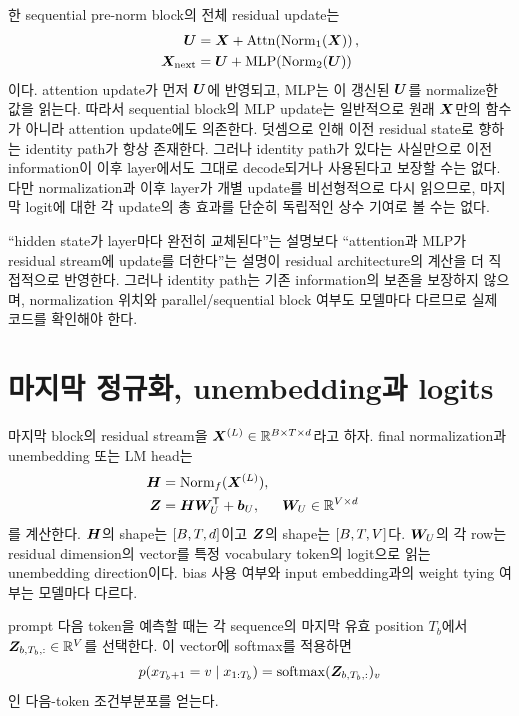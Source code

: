 한 sequential pre-norm block의 전체 residual update는
\begin{align}
  \bm{U}
  &=\bm{X}
    +\operatorname{Attn}\!\left(\operatorname{Norm}_{1}(\bm{X})\right),\\
  \bm{X}_{\mathrm{next}}
  &=\bm{U}
    +\operatorname{MLP}\!\left(\operatorname{Norm}_{2}(\bm{U})\right)
\end{align}
이다.
attention update가 먼저 $\bm{U}$에 반영되고, MLP는 이 갱신된 $\bm{U}$를 normalize한 값을 읽는다.
따라서 sequential block의 MLP update는 일반적으로 원래 $\bm{X}$만의 함수가 아니라 attention update에도 의존한다.
덧셈으로 인해 이전 residual state로 향하는 identity path가 항상 존재한다.
그러나 identity path가 있다는 사실만으로 이전 information이 이후 layer에서도 그대로 decode되거나 사용된다고 보장할 수는 없다.
다만 normalization과 이후 layer가 개별 update를 비선형적으로 다시 읽으므로, 마지막 logit에 대한 각 update의 총 효과를 단순히 독립적인 상수 기여로 볼 수는 없다.

\begin{factbox}
``hidden state가 layer마다 완전히 교체된다''는 설명보다 ``attention과 MLP가 residual stream에 update를 더한다''는 설명이 residual architecture의 계산을 더 직접적으로 반영한다.
그러나 identity path는 기존 information의 보존을 보장하지 않으며, normalization 위치와 parallel/sequential block 여부도 모델마다 다르므로 실제 코드를 확인해야 한다.
\end{factbox}

\section{마지막 정규화, unembedding과 logits}

마지막 block의 residual stream을 $\bm{X}^{(L)}\in\mathbb{R}^{B\times T\times d}$라고 하자.
final normalization과 unembedding 또는 LM head는
\begin{align}
  \bm{H}
  &=\operatorname{Norm}_{f}(\bm{X}^{(L)}),\\
  \bm{Z}
  &=\bm{H}\bm{W}_{U}^{\mathsf T}+\bm{b}_{U},
  &\bm{W}_{U}&\in\mathbb{R}^{V\times d}
\end{align}
를 계산한다.
$\bm{H}$의 shape는 $\left[B,T,d\right]$이고 $\bm{Z}$의 shape는 $\left[B,T,V\right]$다.
$\bm{W}_{U}$의 각 row는 residual dimension의 vector를 특정 vocabulary token의 logit으로 읽는 unembedding direction이다.
bias 사용 여부와 input embedding과의 weight tying 여부는 모델마다 다르다.

prompt 다음 token을 예측할 때는 각 sequence의 마지막 유효 position $T_b$에서 $\bm{Z}_{b,T_b,:}\in\mathbb{R}^{V}$를 선택한다.
이 vector에 softmax를 적용하면
\begin{equation}
  p(x_{T_b+1}=v\mid x_{1:T_b})
  =\operatorname{softmax}(\bm{Z}_{b,T_b,:})_v
\end{equation}
인 다음-token 조건부분포를 얻는다.

